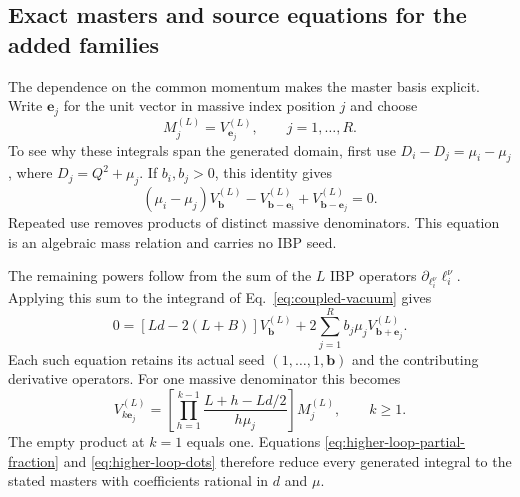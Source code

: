 \subsection{Exact masters and source equations for the added families}
The dependence on the common momentum makes the master basis
explicit. Write $\boldsymbol e_j$ for the unit vector in massive
index position $j$ and choose
\begin{equation}
 M_j^{(L)}=V^{(L)}_{\boldsymbol e_j},
 \qquad j=1,\ldots,R .
 \label{eq:higher-loop-masters}
\end{equation}
To see why these integrals span the generated domain, first use
$D_i-D_j=\mu_i-\mu_j$, where $D_j=Q^2+\mu_j$. If $b_i,b_j>0$,
this identity gives
\begin{equation}
 (\mu_i-\mu_j)V^{(L)}_{\boldsymbol b}
 -V^{(L)}_{\boldsymbol b-\boldsymbol e_i}
 +V^{(L)}_{\boldsymbol b-\boldsymbol e_j}=0 .
 \label{eq:higher-loop-partial-fraction}
\end{equation}
Repeated use removes products of distinct massive denominators.
This equation is an algebraic mass relation and carries no IBP seed.

The remaining powers follow from the sum of the $L$ IBP operators
$\partial_{\ell_i^\nu}\ell_i^\nu$. Applying this sum to the integrand
of Eq.~\eqref{eq:coupled-vacuum} gives
\begin{equation}
 0=[Ld-2(L+B)]V^{(L)}_{\boldsymbol b}
   +2\sum_{j=1}^{R}b_j\mu_j
                 V^{(L)}_{\boldsymbol b+\boldsymbol e_j}.
 \label{eq:higher-loop-euler}
\end{equation}
Each such equation retains its actual seed
$(1,\ldots,1,\boldsymbol b)$ and the contributing derivative operators.
For one massive denominator this becomes
\begin{equation}
 V^{(L)}_{k\boldsymbol e_j}
 =\left[\prod_{h=1}^{k-1}
       \frac{L+h-Ld/2}{h\mu_j}\right]M_j^{(L)},
 \qquad k\geq1 .
 \label{eq:higher-loop-dots}
\end{equation}
The empty product at $k=1$ equals one. Equations
\eqref{eq:higher-loop-partial-fraction} and
\eqref{eq:higher-loop-dots} therefore reduce every generated integral
to the stated masters with coefficients rational in $d$ and $\mu$.

